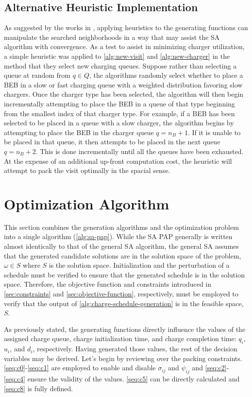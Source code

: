 \documentclass[ee,thesis]{usuthesis}
\begin{document}
\subsection{Alternative Heuristic Implementation}
\label{sec:heuristic-implementation}
As suggested by the works in \cite{Zhang_2010,Xinchao_2011}, applying heuristics to the generating functions can
manipulate the searched neighborhoods in a way that may assist the SA algorithm with convergence. As a test to assist in
minimizing charger utilization, a simple heuristic was applied to \ref{alg:new-visit} and \ref{alg:new-charger} in the
method that they select new charging queues. Suppose rather than selecting a queue at random from \(q \in Q\), the
algorithms randomly select whether to place a BEB in a slow or fast charging queue with a weighted distribution favoring
slow chargers. Once the charger type has been selected, the algorithm will then begin incrementally attempting to place
the BEB in a queue of that type beginning from the smallest index of that charger type. For example, if a BEB has been
selected to be placed in a queue with a slow charger, the algorithm begins by attempting to place the BEB in the charger
queue \(q = n_B + 1\). If it is unable to be placed in that queue, it then attempts to be placed in the next queue \(q =
n_B + 2\). This is done incrementally until all the queues have been exhausted. At the expense of an additional up-front
computation cost, the heuristic will attempt to pack the visit optimally in the spacial sense.

\section{Optimization Algorithm}
\label{sec:optimization-algorithm}
This section combines the generation algorithms and the optimization problem into a single algorithm (\ref{alg:sa-pap}).
While the SA PAP generally is written almost identically to that of the general SA algorithm, the general SA assumes
that the generated candidate solutions are in the solution space of the problem, \(\omega \in S\) where \(S\) is the solution
space. Initialization and the perturbation of a schedule must be verified to ensure that the generated schedule is in
the solution space. Therefore, the objective function and constraints introduced in \ref{sec:constraints} and
\ref{sec:objective-function}, respectively, must be employed to verify that the output of
\ref{alg:charge-schedule-generation} is in the feasible space, \(S\).

As previously stated, the generating functions directly influence the values of the assigned charge queue, charge
initialization time, and charge completion time: \(q_i\), \(u_i\), and \(d_i\), respectively. Having generated those values,
the rest of the decision variables may be derived. Let's begin by reviewing over the packing constraints.
\ref{seq:c0}-\ref{seq:c1} are employed to enable and disable \(\sigma_{ij}\) and \(\psi_{ij}\) and \ref{seq:c2}-\ref{seq:c4} ensure
the validity of the values. \ref{seq:c5} can be directly calculated and \ref{seq:c8} is fully defined.
\end{document}
